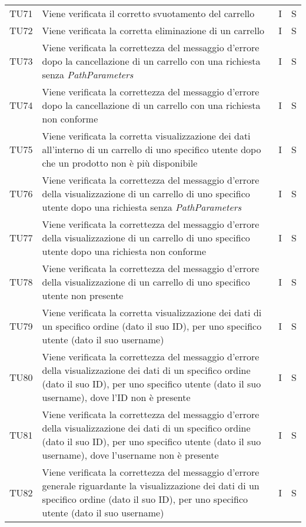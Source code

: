 {\begin{longtable}{C{2cm} C{9.6cm} C{1.5cm} C{1cm}}
TU71 & Viene verificata il corretto svuotamento del carrello & I & S\\

TU72 & Viene verificata la corretta eliminazione di un carrello & I & S\\

TU73 & Viene verificata la correttezza del messaggio d'errore dopo la cancellazione di un carrello con una richiesta senza \textit{PathParameters} & I & S\\

TU74 & Viene verificata la correttezza del messaggio d'errore dopo la cancellazione di un carrello con una richiesta non conforme & I & S\\

TU75 & Viene verificata la corretta visualizzazione dei dati all'interno di un carrello di uno specifico utente dopo che un prodotto non è più disponibile & I & S\\

TU76 & Viene verificata la correttezza del messaggio d'errore della visualizzazione di un carrello di uno specifico utente dopo una richiesta senza \textit{PathParameters} & I & S\\

TU77 & Viene verificata la correttezza del messaggio d'errore della visualizzazione di un carrello di uno specifico utente dopo una richiesta non conforme & I & S\\

TU78 & Viene verificata la correttezza del messaggio d'errore della visualizzazione di un carrello di uno specifico utente non presente & I & S\\

TU79 & Viene verificata la corretta visualizzazione dei dati di un specifico ordine (dato il suo ID), per uno specifico utente (dato il suo username) & I & S\\

TU80 & Viene verificata la correttezza del messaggio d'errore della visualizzazione dei dati di un specifico ordine (dato il suo ID), per uno specifico utente (dato il suo username), dove l'ID non è presente & I & S\\

TU81 & Viene verificata la correttezza del messaggio d'errore della visualizzazione dei dati di un specifico ordine (dato il suo ID), per uno specifico utente (dato il suo username), dove l'username non è presente & I & S\\

TU82 & Viene verificata la correttezza del messaggio d'errore generale riguardante la visualizzazione dei dati di un specifico ordine (dato il suo ID), per uno specifico utente (dato il suo username) & I & S\\


\end{longtable}}
